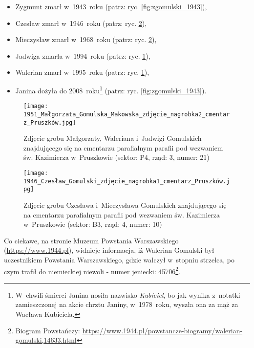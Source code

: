\begin{itemize}
    \item Zygmunt zmarł w~1943~roku (patrz: ryc. \ref{fig:zgomulski_1943}),
    \item Czesław zmarł w~1946~roku (patrz: ryc. \ref{fig:czgomulski_1946}),
    \item Mieczysław zmarł w~1968~roku (patrz: ryc. \ref{fig:czgomulski_1946}),
    \item Jadwiga zmarła w~1994~roku (patrz: ryc. \ref{fig:mgomulska_1951}),
    \item Walerian zmarł w~1995~roku (patrz: ryc. \ref{fig:mgomulska_1951}),
    \item Janina dożyła do 2008~roku\footnote{W~chwili śmierci Janina nosiła 
    nazwisko \emph{Kubiciel}, bo jak wynika z~notatki zamieszczonej na akcie 
    chrztu Janiny, w~1978~roku, wyszła ona za mąż za Wacława Kubiciela.} 
    (patrz: ryc. \ref{fig:zgomulski_1943}).
\end{itemize}

\begin{figure}[!ht]
    \vspace*{0.5cm}
    \centering \texttt{[image: 
        1951\_Małgorzata\_Gomulska\_Makowska\_zdjęcie\_nagrobka2\_cmentarz\_Pruszków.jpg]}
    \captionsetup{format=hang}
    \caption{Zdjęcie grobu Małgorzaty, Waleriana i~Jadwigi Gomulskich 
    znajdującego się na cmentarzu parafialnym parafii pod wezwaniem św. 
    Kazimierza w~Pruszkowie (sektor: P4, rząd: 3, numer: 21)}
    \label{fig:mgomulska_1951}
\end{figure}

\begin{figure}[!ht]
    \vspace*{0.5cm}
    \centering \texttt{[image: 
        1946\_Czesław\_Gomulski\_zdjęcie\_nagrobka1\_cmentarz\_Pruszków.jpg]}
    \captionsetup{format=hang}
    \caption{Zdjęcie grobu Czesława i~Mieczysława Gomulskich znajdującego się 
    na cmentarzu parafialnym parafii pod wezwaniem św. Kazimierza 
    w~Pruszkowie (sektor: B3, rząd: 4, numer: 10)}
    \label{fig:czgomulski_1946}
\end{figure}

Co ciekawe, na stronie Muzeum Powstania Warszawskiego 
(\url{https://www.1944.pl}), widnieje informacja, iż Walerian Gomulski był 
uczestnikiem Powstania Warszawskiego, gdzie walczył w~stopniu strzelca, po 
czym trafił do niemieckiej niewoli - numer jeniecki: 45706\footnote{
Biogram Powstańczy: \url{https://www.1944.pl/powstancze-biogramy/walerian-gomulski,14633.html}}.

